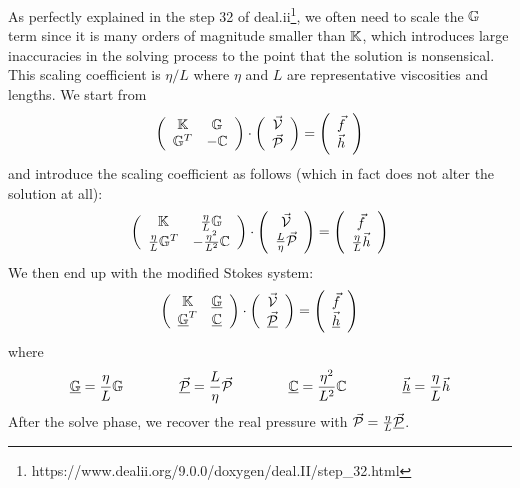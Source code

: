 
As perfectly explained in the step 32 of deal.ii\footnote{https://www.dealii.org/9.0.0/doxygen/deal.II/step\_32.html},
we often need to scale the ${\mathbb{G}}$ term since it is many orders of magnitude smaller than ${\mathbb{K}}$, 
which introduces large inaccuracies in the solving process to the point that the solution is nonsensical. 
This scaling coefficient is $\eta/L$ where $\eta$ and $L$ are representative viscosities and lengths. 
We start from 
\[
\left(
\begin{array}{cc}
{\mathbb{K}} & {\mathbb{G}} \\ {\mathbb{G}}^T & -{\mathbb{C}} 
\end{array}
\right)
\cdot
\left(
\begin{array}{c}
\vec{\cal V} \\ \vec{\cal P}
\end{array}
\right)
=
\left(
\begin{array}{c}
\vec{f} \\ \vec{h}
\end{array}
\right)
\]
and introduce the scaling coefficient as follows (which in fact does not alter the solution at all):
\[
\left(
\begin{array}{cc}
{\mathbb{K}} & \frac{\eta}{L}{\mathbb{G}} \\ \frac{\eta}{L}{\mathbb{G}}^T & - \frac{\eta^2}{L^2} {\mathbb{C}} 
\end{array}
\right)
\cdot
\left(
\begin{array}{c}
\vec{\cal V} \\\frac{L}{\eta} \vec{\cal P}
\end{array}
\right)
=
\left(
\begin{array}{c}
 \vec{f} \\ \frac{\eta}{L} \vec{h}
\end{array}
\right)
\]
We then end up with the modified Stokes system:
\[
\left(
\begin{array}{cc}
{\mathbb{K}} & \underline{{\mathbb{G}}} \\ \underline{{\mathbb{G}}}^T & \underline{{\mathbb{C}}} 
\end{array}
\right)
\cdot
\left(
\begin{array}{c}
\vec{\cal V} \\ \underline{\vec{\cal P}}
\end{array}
\right)
=
\left(
\begin{array}{c}
\vec{f} \\ \underline{\vec{h}}
\end{array}
\right)
\]
where 
\[
\underline{{\mathbb{G}}}=\frac{\eta}{L}{\mathbb{G}}
\quad\quad
\quad\quad
\underline{\vec{\cal P}}=\frac{L}{\eta} \vec{\cal P}
\quad\quad
\quad\quad
\underline{{\mathbb{C}}}=\frac{\eta^2}{L^2} {\mathbb{C}}
\quad\quad
\quad\quad
\underline{\vec{h}}=\frac{\eta}{L}\vec{h}
\]
After the solve phase, we recover the real pressure with $\vec{\cal P}=\frac{\eta}{L}\underline{\vec{\cal P}}$.





